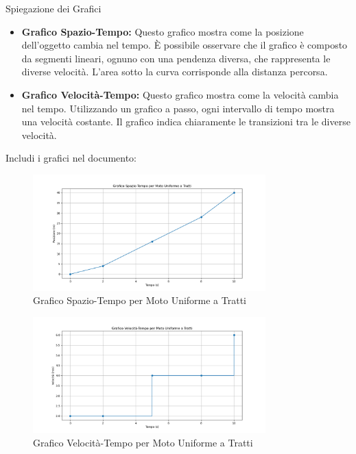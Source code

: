 \documentclass[12pt,a4paper,oneside]{book}
\makeatletter
\renewcommand{\subsubsection}{\@startsection {subsubsection}{3}{\z@}
{-2ex \@plus -0.1ex \@minus -.2ex}
{.2ex \@plus.2ex }
{\color[rgb]{0.141,0.596,0.749}\normalfont\small\sffamily\bfseries}}
\theoremstyle{esercizio}
\makeatother
\begin{document}
\subsubsection{Spiegazione dei Grafici}
\begin{itemize}
    \item \textbf{Grafico Spazio-Tempo:} Questo grafico mostra come la posizione dell'oggetto cambia nel tempo. È possibile osservare che il grafico è composto da segmenti lineari, ognuno con una pendenza diversa, che rappresenta le diverse velocità. L'area sotto la curva corrisponde alla distanza percorsa.
    \item \textbf{Grafico Velocità-Tempo:} Questo grafico mostra come la velocità cambia nel tempo. Utilizzando un grafico a passo, ogni intervallo di tempo mostra una velocità costante. Il grafico indica chiaramente le transizioni tra le diverse velocità.
\end{itemize}

Includi i grafici nel documento:
\begin{figure}[h!]
    \centering
    \includegraphics[width=0.8\textwidth]{img/grafico_spazio_temporale.png}
    \caption{Grafico Spazio-Tempo per Moto Uniforme a Tratti}
    \label{fig:spazio_temporale}
\end{figure}

\begin{figure}[h!]
    \centering
    \includegraphics[width=0.8\textwidth]{img/grafico_velocita_temporale.png}
    \caption{Grafico Velocità-Tempo per Moto Uniforme a Tratti}
    \label{fig:velocita_temporale}
\end{figure}
\end{document}
